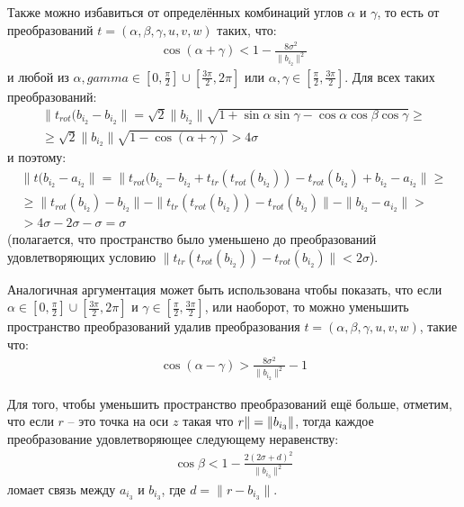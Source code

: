 \documentclass[a4paper]{extreport}
\begin{document}
Также можно избавиться от определённых комбинаций углов $\alpha$ и $\gamma$, то есть от преобразований $t = (\alpha, \beta, \gamma, u, v, w)$ таких, что:
\begin{gather*}
\cos (\alpha + \gamma) < 1 - \frac{8\sigma^2}{\|b_{i_2}\|^2}
\end{gather*}
и любой из $\alpha, gamma \in [0, \frac{\pi}{2}] \cup [\frac{3\pi}{2}, 2\pi]$ или $\alpha, \gamma \in [\frac{\pi}{2}, \frac{3\pi}{2}]$. Для всех таких преобразований:
\begin{gather*}
\| t_{rot} (b_{i_2} - b_{i_2} \| = \sqrt{2} \|b_{i_2}\| \sqrt{1 + \sin \alpha \sin\gamma - \cos\alpha\cos\beta\cos\gamma} \geq \\ \geq
\sqrt{2}\|b_{i_2}\| \sqrt{1 - \cos(\alpha + \gamma)} > 4\sigma
\end{gather*} 
и поэтому:
\begin{gather*}
\|t(b_{i_2} - a_{i_2}\| = \|t_{rot}(b_{i_2} - b_{i_2} + t_{tr}(t_{rot}(b_{i_2})) - t_{rot}(b_{i_2}) + b_{i_2} - a_{i_2} \| \geq \\ \geq
 \|t_{rot} (b_{i_2}) - b_{i_2} \| - \| t_{tr} (t_{rot}(b_{i_2})) - t_{rot} (b_{i_2}) \| - \| b_{i_2} - a_{i_2} \| > \\ > 
 4\sigma - 2\sigma - \sigma = \sigma
\end{gather*}
(полагается, что пространство было уменьшено до преобразований удовлетворяющих условию $\|t_{tr}(t_{rot}(b_{i_2})) - t_{rot}(b_{i_2})\| < 2\sigma$).

Аналогичная аргументация может быть использована чтобы показать, что если $\alpha \in [0, \frac{\pi}{2}] \cup [\frac{3\pi}{2}, 2\pi]$ и $\gamma \in [\frac{\pi}{2}, \frac{3\pi}{2}]$, или наоборот, то можно уменьшить пространство преобразований удалив преобразования $t = (\alpha, \beta, \gamma, u, v, w)$, такие что:
\begin{gather*}
\cos(\alpha - \gamma) > \frac{8\sigma^2}{\|b_{i_2}\|^2} - 1
\end{gather*}

Для того, чтобы уменьшить пространство преобразований ещё больше, отметим, что если $r$ -- это точка на оси $z$ такая что $\\r\| = \|b_{i_3}\|$, тогда каждое преобразование удовлетворяющее следующему неравенству:
\begin{gather*}
\cos\beta < 1 - \frac{2(2\sigma + d)^2}{\|b_{i_3}\|^2}
\end{gather*}
ломает связь между $a_{i_3}$ и $b_{i_3}$, где $d=\|r-b_{i_3}\|$.
\end{document}

